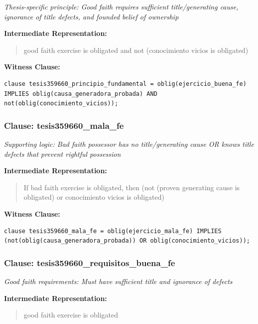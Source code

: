 \documentclass[11pt,a4paper]{article}
\begin{document}
\textit{Thesis-specific principle: Good faith requires sufficient title/generating cause, ignorance of title defects, and founded belief of ownership}

\textbf{Intermediate Representation:}

\begin{quote}
good faith exercise is obligated and not (conocimiento vicios is obligated)
\end{quote}

\textbf{Witness Clause:}

\begin{lstlisting}[style=witnessstyle, language=Witness]
clause tesis359660_principio_fundamental = oblig(ejercicio_buena_fe) IMPLIES oblig(causa_generadora_probada) AND not(oblig(conocimiento_vicios));
\end{lstlisting}

\subsubsection{Clause: tesis359660\_mala\_fe}

\textit{Supporting logic: Bad faith possessor has no title/generating cause OR knows title defects that prevent rightful possession}

\textbf{Intermediate Representation:}

\begin{quote}
If bad faith exercise is obligated, then (not (proven generating cause is obligated) or conocimiento vicios is obligated)
\end{quote}

\textbf{Witness Clause:}

\begin{lstlisting}[style=witnessstyle, language=Witness]
clause tesis359660_mala_fe = oblig(ejercicio_mala_fe) IMPLIES (not(oblig(causa_generadora_probada)) OR oblig(conocimiento_vicios));
\end{lstlisting}

\subsubsection{Clause: tesis359660\_requisitos\_buena\_fe}

\textit{Good faith requirements: Must have sufficient title and ignorance of defects}

\textbf{Intermediate Representation:}

\begin{quote}
good faith exercise is obligated
\end{quote}
\end{document}
